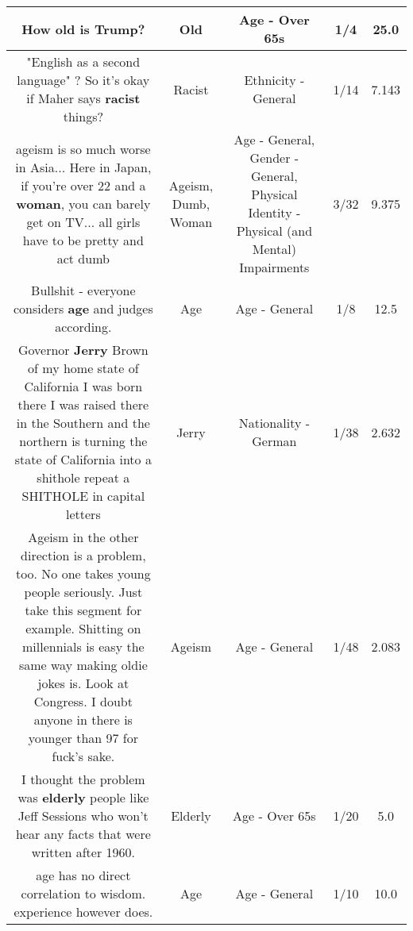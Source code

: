 \documentclass[11pt]{article}
\newlength\mylength
\begin{document}
\begin{center}
\begin{longtable}{|C{.65\mylength}|C{.30\mylength}|C{.12\mylength}|C{.12\mylength}|C{.12\mylength}|}
  \small How \textbf{old} is Trump?\normalsize   & Old & Age - Over 65s & 1/4 & 25.0 \\  \hline
  \small "English as a second language" ?  So it's okay if Maher says \textbf{racist} things?\normalsize   & Racist & Ethnicity - General & 1/14 & 7.143 \\  \hline
  \small ageism is so much worse in Asia... Here in Japan, if you're over 22 and a \textbf{woman}, you can barely get on TV... all girls have to be pretty and act dumb\normalsize   & Ageism, Dumb, Woman & Age - General, Gender - General, Physical Identity - Physical (and Mental) Impairments & 3/32 & 9.375 \\  \hline
  \small Bullshit - everyone considers \textbf{age} and judges according.\normalsize   & Age & Age - General & 1/8 & 12.5 \\  \hline
  \small Governor \textbf{Jerry} Brown of my home state of California I was born there I was  raised there in the Southern and the northern is turning the state of California into a shithole repeat a SHITHOLE  in capital letters\normalsize   & Jerry & Nationality - German & 1/38 & 2.632 \\  \hline
  \small Ageism in the other direction is a problem, too. No one takes young people seriously. Just take this segment for example. Shitting on millennials is easy the same way making oldie jokes is. Look at Congress. I doubt anyone in there is younger than 97 for fuck's sake.\normalsize   & Ageism & Age - General & 1/48 & 2.083 \\  \hline
  \small I thought the problem was \textbf{elderly} people like Jeff Sessions who won't hear any facts that were written after 1960.\normalsize   & Elderly & Age - Over 65s & 1/20 & 5.0 \\  \hline
  \small age has no direct correlation to wisdom. experience however does.\normalsize   & Age & Age - General & 1/10 & 10.0 \\  \hline

\end{longtable}
\end{center}
\end{document}
